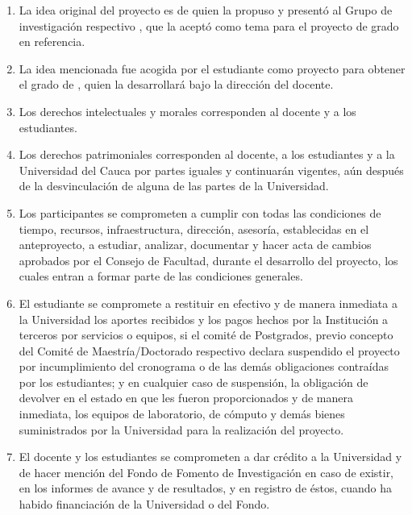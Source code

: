 \begin{enumerate}[topsep=0pt, leftmargin=0.6cm, label=\arabic*.-]

    \item La idea original del proyecto es de \underline{\hspace{15ex}} quien la propuso y presentó al Grupo de investigación respectivo \underline{\hspace{20ex}}, que la aceptó como tema para el proyecto de grado en referencia.
    
    \item La idea mencionada fue acogida por el  estudiante como proyecto para obtener el grado de \underline{\hspace{8ex}} \underline{\hspace{22ex}}, quien la desarrollará bajo la dirección del docente.
    
    \item Los derechos intelectuales y morales corresponden al docente y a los estudiantes.
    
    \item Los derechos patrimoniales corresponden al docente, a los estudiantes y a la Universidad del Cauca por partes iguales y continuarán vigentes, aún después de la desvinculación de alguna de las partes de la Universidad.
    
    \item Los participantes se comprometen a cumplir con todas las condiciones de tiempo, recursos, infraestructura, dirección, asesoría, establecidas en el anteproyecto, a estudiar, analizar, documentar y hacer acta de cambios aprobados por el Consejo de Facultad, durante el desarrollo del proyecto, los cuales entran a formar parte de las condiciones generales.
    
    \item El estudiante se compromete a restituir en efectivo y de manera inmediata a la Universidad los aportes recibidos y los pagos hechos por la Institución  a terceros por servicios o equipos, si el comité de Postgrados, previo concepto del Comité de Maestría/Doctorado respectivo declara suspendido el proyecto por incumplimiento del cronograma o de las demás obligaciones contraídas por los estudiantes; y en cualquier caso de suspensión, la obligación de devolver en el estado en que les fueron proporcionados y de manera inmediata, los equipos de laboratorio, de cómputo y demás bienes suministrados por la Universidad para la realización del proyecto.
    
    \item El docente y los estudiantes se comprometen a dar crédito a la Universidad y de hacer mención del Fondo de Fomento de Investigación en caso de existir, en los informes de avance y de resultados, y en registro de éstos, cuando ha habido financiación de la Universidad o del Fondo.
    

\end{enumerate}
